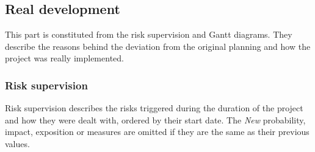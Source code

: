 %
%
%
%






\subsection{Real development}
This part is constituted from the risk supervision and Gantt diagrams.
They describe the reasons behind the deviation from the original planning and how the project was really implemented.

\subsubsection{Risk supervision}
Risk supervision describes the risks triggered during the duration of the project and how they were dealt with, ordered by their start date.
The \textit{New} probability, impact, exposition or measures are omitted if they are the same as their previous values.

